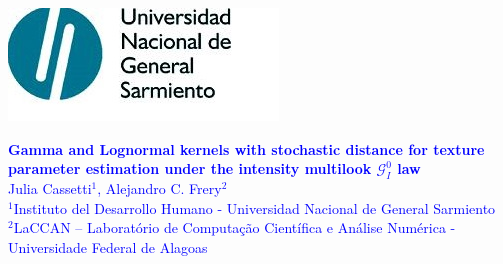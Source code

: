 \documentclass[a0,portrait]{a0poster}
\title{}
\author{}
\date{}
\begin{document}

\begin{center}
	\begin{minipage}{.15\linewidth}
		\includegraphics[width=.95\linewidth]{../../../../logos/LogoUNGS.JPG}
	\end{minipage}
	\hspace{.01\linewidth}
	\begin{minipage}{.65\linewidth}
		\begin{center}
			\textcolor{blue}{\huge \textbf{Gamma and Lognormal kernels with stochastic distance for texture parameter estimation under the intensity multilook $\mathcal G_I^0$ law}}\\
			\vspace{0.5cm}
			\textcolor{blue}{\large{ Julia Cassetti{\small $^1$}, Alejandro C. Frery{\small $^2$}}\\
				\textcolor{blue}{\small{$^1$Instituto del Desarrollo Humano -  Universidad Nacional de General Sarmiento}}\\
				\textcolor{blue}{\small{$^2$LaCCAN -- Laborat\'orio de Computa\c c\~ao Cient\'ifica e An\'alise Num\'erica -Universidade Federal de Alagoas}}}\\
		\end{center}
	\end{minipage}
	\hspace{.01\linewidth}
	\begin{minipage}{0.15\linewidth}
		\begin{center}

\end{center}
\end{minipage}
\end{center}
\end{document}
